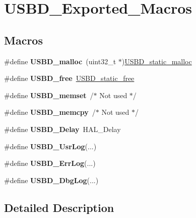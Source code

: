 \hypertarget{group___u_s_b_d___exported___macros}{}\section{U\+S\+B\+D\+\_\+\+Exported\+\_\+\+Macros}
\label{group___u_s_b_d___exported___macros}
\subsection*{Macros}
\begin{DoxyCompactItemize}
\item 
\mbox{\label{group___u_s_b_d___exported___macros_ga35ff353194f56823357f503e546ccf4b}} 
\#define {\bfseries U\+S\+B\+D\+\_\+malloc}~(uint32\+\_\+t $\ast$)\mbox{\hyperlink{group___u_s_b_d___c_o_n_f_ga2df01b9aae6026e9f6b55da3b1e72aee}{U\+S\+B\+D\+\_\+static\+\_\+malloc}}
\item 
\mbox{\label{group___u_s_b_d___exported___macros_gab44fcf9b4d7bfbe8b1308eca76975fe5}} 
\#define {\bfseries U\+S\+B\+D\+\_\+free}~\mbox{\hyperlink{group___u_s_b_d___c_o_n_f_ga92ed1214efe53f54b3586a6233cfa5a6}{U\+S\+B\+D\+\_\+static\+\_\+free}}
\item 
\mbox{\label{group___u_s_b_d___exported___macros_gaf7b31857d15ef0abbd84e0e70a2b903f}} 
\#define {\bfseries U\+S\+B\+D\+\_\+memset}~/$\ast$ Not used $\ast$/
\item 
\mbox{\label{group___u_s_b_d___exported___macros_ga18d9c17ef2afe7244b559ed428ca1e81}} 
\#define {\bfseries U\+S\+B\+D\+\_\+memcpy}~/$\ast$ Not used $\ast$/
\item 
\mbox{\label{group___u_s_b_d___exported___macros_ga78993b66136329032c26d0c13a78e963}} 
\#define {\bfseries U\+S\+B\+D\+\_\+\+Delay}~H\+A\+L\+\_\+\+Delay
\item 
\mbox{\label{group___u_s_b_d___exported___macros_gad0adad09bbf4f06418659a39edc0f6c6}} 
\#define {\bfseries U\+S\+B\+D\+\_\+\+Usr\+Log}(...)
\item 
\mbox{\label{group___u_s_b_d___exported___macros_ga077a76b66987212e70c3c4db2ca73a8b}} 
\#define {\bfseries U\+S\+B\+D\+\_\+\+Err\+Log}(...)
\item 
\mbox{\label{group___u_s_b_d___exported___macros_ga009d0ba418c356a4668fac6115b07ac5}} 
\#define {\bfseries U\+S\+B\+D\+\_\+\+Dbg\+Log}(...)
\end{DoxyCompactItemize}


\subsection{Detailed Description}
